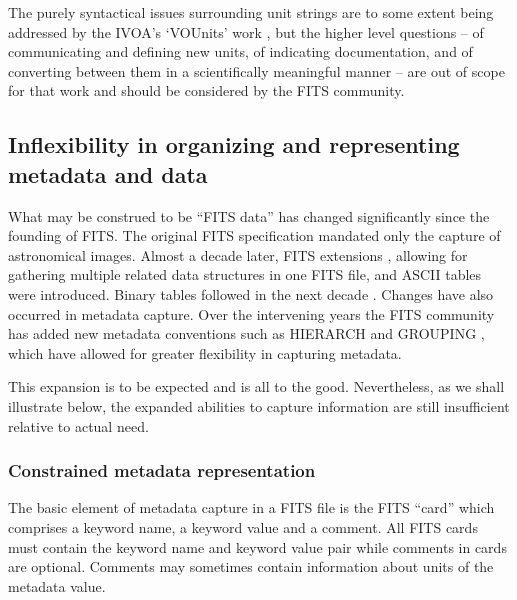 \documentclass[final,authoryear,5p,times,twocolumn]{elsarticle}
\begin{document}
The purely syntactical issues surrounding unit strings are to some
extent being addressed by the IVOA's `VOUnits' work \citep{VOUnits}, but the higher
level questions -- of communicating and defining new units, of
indicating documentation, and of converting between them in a
scientifically meaningful manner -- are out of scope for that work and
should be considered by the FITS community.


\subsection{Inflexibility in organizing and representing metadata and data}


What may be construed to be ``FITS data'' has changed significantly
since the founding of FITS. The original FITS specification mandated
only the capture of astronomical images. Almost a decade later, FITS
extensions \citep{1988A&AS...73..359G}, allowing for gathering
multiple related data structures in one FITS file, and ASCII tables
\citep{1988A&AS...73..365H} were introduced. Binary tables followed in
the next decade \citep{1995A&AS..113..159C}. Changes have also
occurred in metadata capture. Over the intervening years the FITS
community has added new metadata conventions such as HIERARCH
\citep{2009Wic} and GROUPING \citep{2007Jen}, which have allowed for
greater flexibility in capturing metadata.


This expansion is to be expected and is all to the good. Nevertheless,
as we shall illustrate below, the expanded abilities to capture
information are still insufficient relative to actual need.


\subsubsection{Constrained metadata representation}


The basic element of metadata capture in a FITS file is the FITS
``card'' which comprises a keyword name, a keyword value and a
comment. All FITS cards must contain the keyword name and keyword
value pair while comments in cards are optional. Comments may
sometimes contain information about units of the metadata value.
\end{document}
